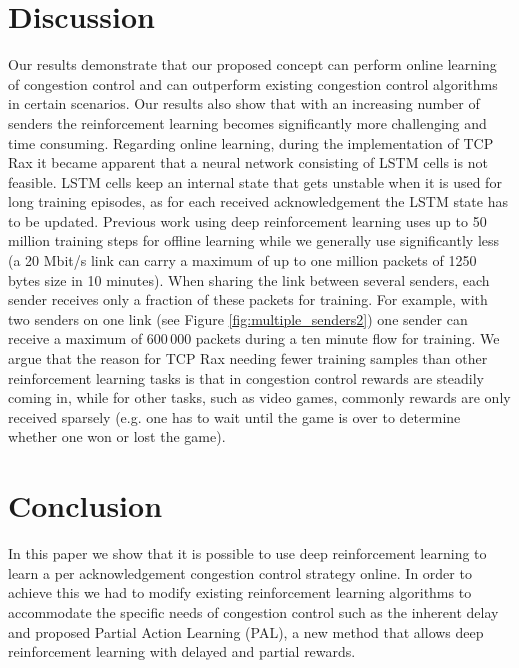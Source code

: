 \documentclass[newfonts=false,format=sigconf,10pt,letterpaper]{acmart}
\begin{document}
\section{Discussion}

Our results demonstrate that our proposed concept can perform online learning of congestion control and can outperform existing congestion control algorithms in certain scenarios. Our results also show that with an increasing number of senders the reinforcement learning becomes significantly more challenging and time consuming. Regarding online learning, during the implementation of TCP Rax it became apparent that a neural network consisting of LSTM cells \cite{gers_learning_1999} is not feasible. LSTM cells keep an internal state that gets unstable when it is used for long training episodes, as for each received acknowledgement the LSTM state has to be updated. Previous work using deep reinforcement learning uses up to 50 million training steps for offline learning \cite{mnih_asynchronous_2016} while we generally use significantly less (a 20 Mbit/s link can carry a maximum of up to one million packets of 1250 bytes size in 10 minutes). When sharing the link between several senders, each sender receives only a fraction of these packets for training. For example, with two senders on one link (see Figure \ref{fig:multiple_senders2}) one sender can receive a maximum of 600\,000 packets during a ten minute flow for training. We argue that the reason for TCP Rax needing fewer training samples than other reinforcement learning tasks is that in congestion control rewards are steadily coming in, while for other tasks, such as video games, commonly rewards are only received sparsely (e.g. one has to wait until the game is over to determine whether one won or lost the game).

\section{Conclusion}


In this paper we show that it is possible to use deep reinforcement learning to learn a per acknowledgement congestion control strategy online. In order to achieve this we had to modify existing reinforcement learning algorithms to accommodate the specific needs of congestion control such as the inherent delay and proposed Partial Action Learning (PAL), a new method that allows deep reinforcement learning with delayed and partial rewards.
\end{document}
